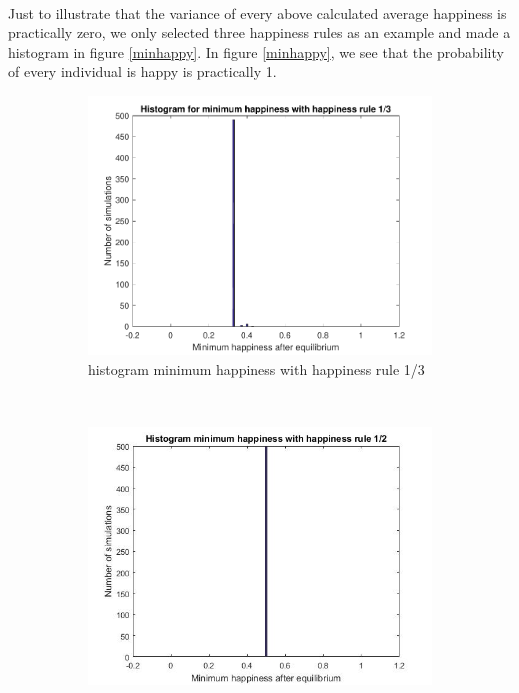 \\
Just to illustrate that the variance of every above calculated average happiness is practically zero, we only selected three happiness rules as an example and made a histogram in figure \ref{minhappy}. 
In figure \ref{minhappy}, we see that the probability of every individual is happy is practically 1.
\newpage
\begin{figure}[H]
    \centering
    \begin{subfigure}{0.32\textwidth}
        \includegraphics[width=\textwidth]{histogram_min_happiness_een_derde}
        \caption{histogram minimum happiness with happiness rule 1/3}
        \label{fig:gull}
    \end{subfigure}
    ~ %
    \begin{subfigure}{0.32\textwidth}
        \includegraphics[width=\textwidth]{histogram_min_happiness_half}

\end{subfigure}
\end{figure}
